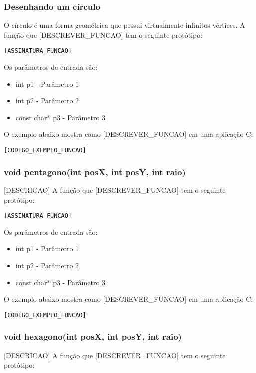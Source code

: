 \documentclass[12pt, %
openright,
oneside, %
a4paper,    %
brazil]{facom-ufu-abntex2}
\begin{document}
\subsubsection{Desenhando um círculo}
O círculo é uma forma geométrica que possui virtualmente infinitos vértices.
A função que [DESCREVER_FUNCAO] tem o seguinte protótipo:

\begin{lstlisting}
[ASSINATURA_FUNCAO]
\end{lstlisting}

Os parâmetros de entrada são:

\begin{itemize}
    \item int p1 - Parâmetro 1
    \item int p2 - Parâmetro 2
    \item const char* p3 - Parâmetro 3
\end{itemize}

O exemplo abaixo mostra como [DESCREVER_FUNCAO] em uma aplicação C:

\begin{lstlisting}
[CODIGO_EXEMPLO_FUNCAO]
\end{lstlisting}

\subsubsection{void pentagono(int posX, int posY, int raio)}
[DESCRICAO]
A função que [DESCREVER_FUNCAO] tem o seguinte protótipo:

\begin{lstlisting}
[ASSINATURA_FUNCAO]
\end{lstlisting}

Os parâmetros de entrada são:

\begin{itemize}
    \item int p1 - Parâmetro 1
    \item int p2 - Parâmetro 2
    \item const char* p3 - Parâmetro 3
\end{itemize}

O exemplo abaixo mostra como [DESCREVER_FUNCAO] em uma aplicação C:

\begin{lstlisting}
[CODIGO_EXEMPLO_FUNCAO]
\end{lstlisting}

\subsubsection{void hexagono(int posX, int posY, int raio)}
[DESCRICAO]
A função que [DESCREVER_FUNCAO] tem o seguinte protótipo:
\end{document}
